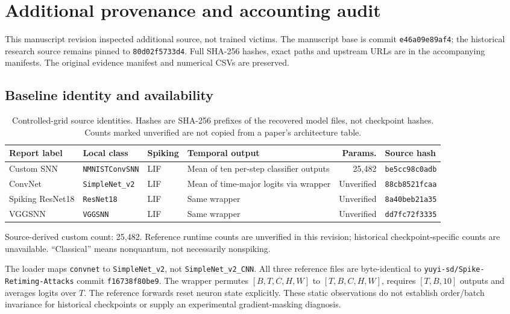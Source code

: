 \section{Additional provenance and accounting audit}
\label{sec:phase4_availability}
This manuscript revision inspected additional source, not trained victims. The manuscript base is commit \texttt{e46a09e89af4}; the historical research source remains pinned to \texttt{80d02f5733d4}. Full SHA-256 hashes, exact paths and upstream URLs are in the accompanying  manifests. The original evidence manifest and numerical CSVs are preserved.

\subsection{Baseline identity and availability}
\begin{table}[H]\centering\small
\caption{Controlled-grid source identities. Hashes are SHA-256 prefixes of the recovered model files, not checkpoint hashes. Counts marked unverified are not copied from a paper's architecture table.}
\begin{tabularx}{\linewidth}{L L l L r l}\toprule
Report label & Local class & Spiking & Temporal output & Params. & Source hash\\\midrule
Custom SNN & \texttt{NMNISTConvSNN} & LIF & Mean of ten per-step classifier outputs & 25,482 & \texttt{be5cc98c0adb}\\
ConvNet & \texttt{SimpleNet\_v2} & LIF & Mean of time-major logits via wrapper & Unverified & \texttt{88cb8521fcaa}\\
Spiking ResNet18 & \texttt{ResNet18} & LIF & Same wrapper & Unverified & \texttt{8a40beb21a35}\\
VGGSNN & \texttt{VGGSNN} & LIF & Same wrapper & Unverified & \texttt{dd7fc72f3335}\\\bottomrule
\end{tabularx}
\par\smallskip\footnotesize Source-derived custom count: 25,482. Reference runtime counts are unverified in this revision; historical checkpoint-specific counts are unavailable. ``Classical'' means nonquantum, not necessarily nonspiking.
\end{table}
The loader maps \texttt{convnet} to \texttt{SimpleNet\_v2}, not \texttt{SimpleNet\_v2\_CNN}. All three reference files are byte-identical to \texttt{yuyi-sd/Spike-Retiming-Attacks} commit \texttt{f16738f80be9}. The wrapper permutes $[B,T,C,H,W]$ to $[T,B,C,H,W]$, requires $[T,B,10]$ outputs and averages logits over $T$. The reference forwards reset neuron state explicitly. These static observations do not establish order/batch invariance for historical checkpoints or supply an experimental gradient-masking diagnosis.

